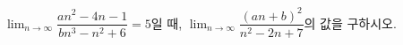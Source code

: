 $\displaystyle\lim_{n\to\infty}\dfrac{an^2-4n-1}{bn^3-n^2+6}=5$일 때, $\displaystyle\lim_{n\to\infty}\dfrac{(an+b)^2}{n^2-2n+7}$의 값을 구하시오. 
